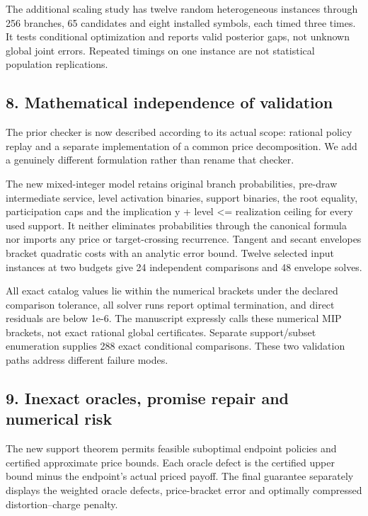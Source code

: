 \documentclass[11pt,letterpaper]{article}
\begin{document}
The additional scaling study has twelve random heterogeneous instances through 256 branches, 65 candidates and eight installed symbols, each timed three times. It tests conditional optimization and reports valid posterior gaps, not unknown global joint errors. Repeated timings on one instance are not statistical population replications.



\subsection*{8. Mathematical independence of validation}


The prior checker is now described according to its actual scope: rational policy replay and a separate implementation of a common price decomposition. We add a genuinely different formulation rather than rename that checker.



The new mixed-integer model retains original branch probabilities, pre-draw intermediate service, level activation binaries, support binaries, the root equality, participation caps and the implication y + level <= realization ceiling for every used support. It neither eliminates probabilities through the canonical formula nor imports any price or target-crossing recurrence. Tangent and secant envelopes bracket quadratic costs with an analytic error bound. Twelve selected input instances at two budgets give 24 independent comparisons and 48 envelope solves.



All exact catalog values lie within the numerical brackets under the declared comparison tolerance, all solver runs report optimal termination, and direct residuals are below 1e-6. The manuscript expressly calls these numerical MIP brackets, not exact rational global certificates. Separate support/subset enumeration supplies 288 exact conditional comparisons. These two validation paths address different failure modes.



\subsection*{9. Inexact oracles, promise repair and numerical risk}


The new support theorem permits feasible suboptimal endpoint policies and certified approximate price bounds. Each oracle defect is the certified upper bound minus the endpoint's actual priced payoff. The final guarantee separately displays the weighted oracle defects, price-bracket error and optimally compressed distortion--charge penalty.
\end{document}
